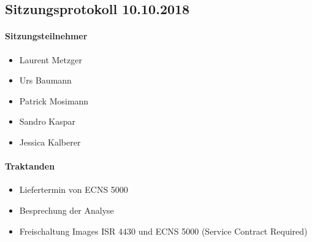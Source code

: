 \subsection{Sitzungsprotokoll 10.10.2018}

\paragraph{Sitzungsteilnehmer}
\begin{itemize}	
	\item Laurent Metzger 
	\item Urs Baumann
	\item Patrick Mosimann
	\item Sandro Kaspar
	\item Jessica Kalberer
\end{itemize}

\paragraph{Traktanden}
\begin{itemize}	
	\item Liefertermin von ECNS 5000
	\item Besprechung der Analyse
	\item Freischaltung Images ISR 4430 und ECNS 5000 (Service Contract Required)
\end{itemize}


